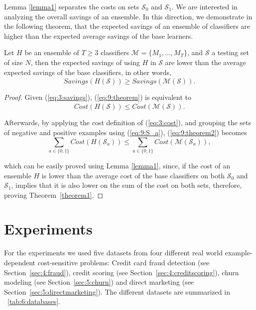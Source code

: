 {  Lemma \ref{lemma1} separates the costs on sets $\mathcal{S}_0$ and  $\mathcal{S}_1$. We are 
  interested in analyzing the overall savings of an ensemble. In this direction, we demonstrate 
  in the following theorem, that the expected savings of an ensemble of classifiers are higher 
  than the expected average savings of the base learners.
  
  \begin{theorem}\label{theorem1}
  Let $H$ be an ensemble of $T\ge3$ classifiers $\mathcal{M}=\{M_1,\dots,M_T\}$, and $\mathcal{S}$ a 
  testing set of size $ N $, then the expected savings of using $H$ in 
  $\mathcal{S}$ are lower than the average expected savings of the base classifiers, in other words,
  \begin{equation}\label{eq:9:theorem}
    Savings(H(\mathcal{S})) \ge \overline{Savings}(\mathcal{M}(\mathcal{S})). 
  \end{equation}
  \end{theorem}
  
  \begin{proof}
  Given (\ref{eq:3:savings}), (\ref{eq:9:theorem}) is equivalent to
  \begin{equation}\label{eq:9:theorem2}
    Cost(H(\mathcal{S})) \le \overline{Cost} (\mathcal{M}(\mathcal{S})). 
  \end{equation}

  \noindent Afterwards, by applying the cost definition of (\ref{eq:3:cost}), and grouping the 
  sets of negative and positive examples using (\ref{eq:9:S_a}), (\ref{eq:9:theorem2}) becomes
  \begin{equation}
    \sum_{a\in \{0,1\}} Cost(H(\mathcal{S}_a)) \le \sum_{a\in \{0,1\}} \overline{Cost} (\mathcal{M} 
    (\mathcal{S}_a)),
  \end{equation}
  
  \noindent which can be easily proved using Lemma \ref{lemma1}, since, if the cost of an ensemble 
  $H$ is  lower than the average cost of the base classifiers on both $\mathcal{S}_0$ and 
  $\mathcal{S}_1$,  implies that it is also lower on the sum of the cost on both sets, 
  therefore, proving Theorem~\ref{theorem1}.
  \end{proof}
 
\newpage
\section{Experiments}
\label{sec:9:experiments}

For the experiments we used five datasets from four different real world example-dependent 
cost-sensitive problems: Credit card fraud detection (see Section~\ref{sec:4:fraud}), credit 
scoring (see Section~\ref{sec:4:creditscoring}), churn modeling (see Section~\ref{sec:5:churn}) and 
direct marketing (see Section~\ref{sec:5:directmarketing}). The different datasets are summarized 
in \tablename{~\ref{tab:6:databases}}.

}
